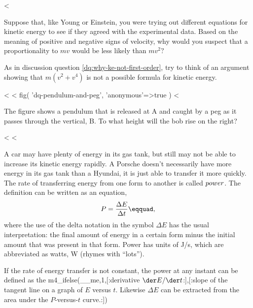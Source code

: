 <%


\startdqs

\begin{dq}\label{dq:why-ke-not-first-order}
Suppose that, like Young or Einstein, you were trying out
different equations for kinetic energy to see if they agreed
with the experimental data. Based on the meaning of positive
and negative signs of velocity, why would you suspect that
a proportionality to $mv$ would be less likely than $mv^2?$
\end{dq}

\begin{dq}\label{dq:why-no-fourth-order-term-in-ke}
As in discussion question \ref{dq:why-ke-not-first-order}, try to
think of an argument showing that $m(v^2+v^4)$ is not a possible
formula for kinetic energy.
\end{dq}

<%
<%
  fig(
    'dq-pendulum-and-peg',
    {
      'anonymous'=>true
    }
  )
<%
\begin{dq}\label{dq:pendulum-and-peg}
The figure
 shows a pendulum that is released at A and
caught by a peg as it passes through the vertical, B. To
what height will the bob rise on the right?
\end{dq}

<%
<%

A car may have plenty of energy in its gas tank, but still
may not be able to increase its kinetic energy rapidly. A
Porsche doesn't necessarily have more energy in its gas tank
than a Hyundai, it is just able to transfer it more quickly.
The rate of transferring energy from one form to another is
called $\index{power}power$. The definition can be
written as an equation,
\begin{equation*}
                P    =     \frac{\Delta E}{\Delta t}\eqquad,
\end{equation*}
where the use of the delta notation in the symbol $\Delta E$
has the usual interpretation: the final amount of energy in a
certain form minus the initial amount that was present in
that form. Power has units of J/s, which are abbreviated as
watts, W (rhymes with ``lots'').

If the rate of energy transfer is not constant, the power at
any instant can be defined as the 
m4_ifelse(__me,1,[:derivative $\der E/\der t$:],[:slope of the tangent line
on a graph of $E$ versus $t$. Likewise $\Delta E$ can be
extracted from the area under the $P$-versus-$t$ curve.:])

